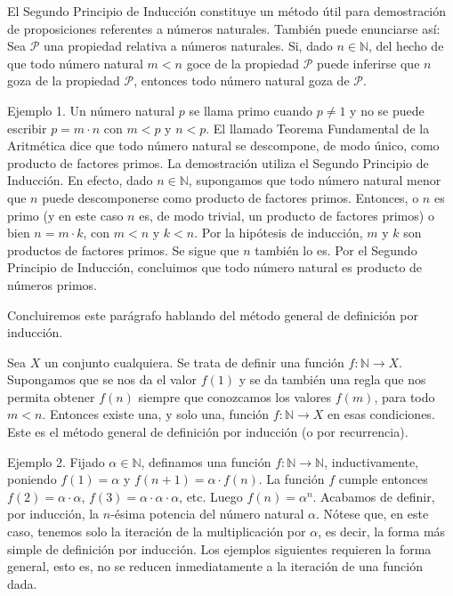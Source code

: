 \documentclass[12pt,oneside]{book}
\begin{document}
El Segundo Principio de Inducción constituye un método útil para demostración de proposiciones referentes a números naturales. También puede enunciarse así: Sea \( \mathcal{P} \) una propiedad relativa a números naturales. Si, dado \( n \in \mathbb{N} \), del hecho de que todo número natural \( m < n \) goce de la propiedad \( \mathcal{P} \) puede inferirse que \( n \) goza de la propiedad \( \mathcal{P} \), entonces todo número natural goza de \( \mathcal{P} \).

Ejemplo 1. Un número natural \( p \) se llama primo cuando \( p \neq 1 \) y no se puede escribir \( p = m \cdot n \) con \( m < p \) y \( n < p \). El llamado Teorema Fundamental de la Aritmética dice que todo número natural se descompone, de modo único, como producto de factores primos. La demostración utiliza el Segundo Principio de Inducción. En efecto, dado \( n \in \mathbb{N} \), supongamos que todo número natural menor que \( n \) puede descomponerse como producto de factores primos. Entonces, o \( n \) es primo (y en este caso \( n \) es, de modo trivial, un producto de factores primos) o bien \(n = m \cdot k\), con \(m < n\) y \(k < n\). Por la hipótesis de inducción, \(m\) y \(k\) son productos de factores primos. Se sigue que \(n\) también lo es. Por el Segundo Principio de Inducción, concluimos que todo número natural es producto de números primos.

Concluiremos este parágrafo hablando del método general de definición por inducción.

Sea \(X\) un conjunto cualquiera. Se trata de definir una función \(f: \mathbb{N} \to X\). Supongamos que se nos da el valor \(f(1)\) y se da también una regla que nos permita obtener \(f(n)\) siempre que conozcamos los valores \(f(m)\), para todo \(m < n\). Entonces existe una, y solo una, función \(f: \mathbb{N} \to X\) en esas condiciones. Este es el método general de definición por inducción (o por recurrencia).

Ejemplo 2. Fijado \(\alpha \in \mathbb{N}\), definamos una función \(f: \mathbb{N} \to \mathbb{N}\), inductivamente, poniendo \(f(1) = \alpha\) y \(f(n+1) = \alpha \cdot f(n)\). La función \(f\) cumple entonces \(f(2) = \alpha \cdot \alpha\), \(f(3) = \alpha \cdot \alpha \cdot \alpha\), etc. Luego \(f(n) = \alpha^n\). Acabamos de definir, por inducción, la \(n\)-ésima potencia del número natural \(\alpha\). Nótese que, en este caso, tenemos solo la iteración de la multiplicación por \(\alpha\), es decir, la forma más simple de definición por inducción. Los ejemplos siguientes requieren la forma general, esto es, no se reducen inmediatamente a la iteración de una función dada.
\end{document}
